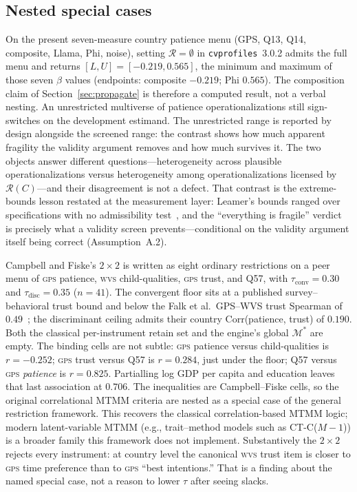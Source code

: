 \documentclass[10pt,letterpaper]{article}
\newcommand{\GPS}{\textsc{gps}}
\newcommand{\WVS}{\textsc{wvs}}
\newcommand{\cvp}{\texttt{cvprofiles}}
\newcommand{\M}{\ensuremath{\mathcal{M}}}
\newcommand{\Rset}{\mathcal{R}}
\begin{document}
\subsection{Nested special cases}
\label{sec:app-special}

On the present seven-measure country patience menu (GPS, Q13, Q14, composite, Llama, Phi, noise), setting $\Rset=\emptyset$ in \cvp{}~3.0.2 admits the full menu and returns $[L,U]=[-0.219,0.565]$, the minimum and maximum of those seven $\beta$ values (endpoints: composite $-0.219$; Phi $0.565$).
The composition claim of Section~\ref{sec:propagate} is therefore a computed result, not a verbal nesting.
An unrestricted multiverse of patience operationalizations still sign-switches on the development estimand.
The unrestricted range is reported by design alongside the screened range: the contrast shows how much apparent fragility the validity argument removes and how much survives it.
The two objects answer different questions---heterogeneity across plausible operationalizations versus heterogeneity among operationalizations licensed by $\Rset(C)$---and their disagreement is not a defect.
That contrast is the extreme-bounds lesson restated at the measurement layer: Leamer's bounds ranged over specifications with no admissibility test~\cite{leamer1983}, and the ``everything is fragile'' verdict~\cite{salaimartin1997} is precisely what a validity screen prevents---conditional on the validity argument itself being correct (Assumption~A.2).

Campbell and Fiske's $2\times 2$ is written as eight ordinary restrictions on a peer menu of \GPS{} patience, \WVS{} child-qualities, \GPS{} trust, and Q57, with $\tau_{\mathrm{conv}}=0.30$ and $\tau_{\mathrm{disc}}=0.35$ ($n=41$).
The convergent floor sits at a published survey--behavioral trust bound and below the Falk et al.\ GPS--WVS trust Spearman of $0.49$~\cite{falk2018}; the discriminant ceiling admits their country Corr(patience, trust) of $0.190$.
Both the classical per-instrument retain set and the engine's global $\M^*$ are empty.
The binding cells are not subtle: \GPS{} patience versus child-qualities is $r=-0.252$; \GPS{} trust versus Q57 is $r=0.284$, just under the floor; Q57 versus \GPS{} \emph{patience} is $r=0.825$.
Partialling log GDP per capita and education leaves that last association at $0.706$.
The inequalities are Campbell--Fiske cells, so the original correlational MTMM criteria are nested as a special case of the general restriction framework.
This recovers the classical correlation-based MTMM logic; modern latent-variable MTMM (e.g., trait--method models such as CT-C($M-1$)) is a broader family this framework does not implement.
Substantively the $2\times 2$ rejects every instrument: at country level the canonical \WVS{} trust item is closer to \GPS{} time preference than to \GPS{} ``best intentions.''
That is a finding about the named special case, not a reason to lower $\tau$ after seeing slacks.
\end{document}
